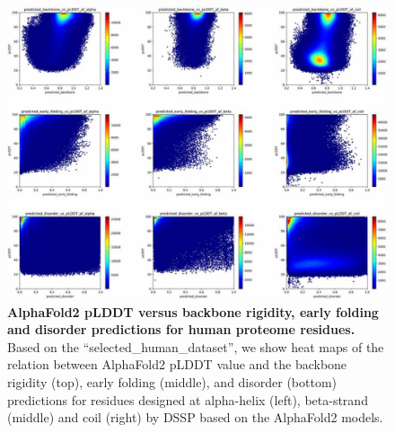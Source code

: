 \begin{figure}[tbh!]
    \centering
    \includegraphics[width=\linewidth]{ambiguous//figures_ambiguous/fig5.pdf}
    \caption{\textbf{AlphaFold2 pLDDT versus backbone rigidity, early folding and disorder predictions for human proteome residues.} Based on the ``selected_human_dataset'', we show heat maps of the relation between AlphaFold2 pLDDT value and the backbone rigidity (top), early folding (middle), and disorder (bottom) predictions for residues designed at alpha-helix (left), beta-strand (middle) and coil (right) by DSSP based on the AlphaFold2 models.}
    \label{fig:chapter5:fig5}
\end{figure}

